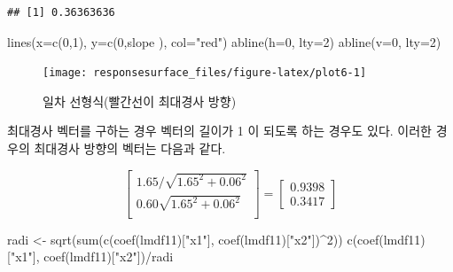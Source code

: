 \documentclass[
]{book}
\newenvironment{Shaded}{\begin{snugshade}}{\end{snugshade}}
\newcommand{\AttributeTok}[1]{\textcolor[rgb]{0.77,0.63,0.00}{#1}}
\newcommand{\DecValTok}[1]{\textcolor[rgb]{0.00,0.00,0.81}{#1}}
\newcommand{\FunctionTok}[1]{\textcolor[rgb]{0.00,0.00,0.00}{#1}}
\newcommand{\NormalTok}[1]{#1}
\newcommand{\OtherTok}[1]{\textcolor[rgb]{0.56,0.35,0.01}{#1}}
\newcommand{\SpecialCharTok}[1]{\textcolor[rgb]{0.00,0.00,0.00}{#1}}
\newcommand{\StringTok}[1]{\textcolor[rgb]{0.31,0.60,0.02}{#1}}
\theoremstyle{definition}
\theoremstyle{definition}
\theoremstyle{definition}
\theoremstyle{definition}
\theoremstyle{remark}
\begin{document}
\begin{verbatim}
## [1] 0.36363636
\end{verbatim}

\begin{Shaded}
\begin{Highlighting}[]
\FunctionTok{lines}\NormalTok{(}\AttributeTok{x=}\FunctionTok{c}\NormalTok{(}\DecValTok{0}\NormalTok{,}\DecValTok{1}\NormalTok{), }\AttributeTok{y=}\FunctionTok{c}\NormalTok{(}\DecValTok{0}\NormalTok{,slope ), }\AttributeTok{col=}\StringTok{"red"}\NormalTok{)}
\FunctionTok{abline}\NormalTok{(}\AttributeTok{h=}\DecValTok{0}\NormalTok{, }\AttributeTok{lty=}\DecValTok{2}\NormalTok{)}
\FunctionTok{abline}\NormalTok{(}\AttributeTok{v=}\DecValTok{0}\NormalTok{, }\AttributeTok{lty=}\DecValTok{2}\NormalTok{)}
\end{Highlighting}
\end{Shaded}

\begin{figure}

{\centering \texttt{[image: responsesurface\_files/figure-latex/plot6-1]} 

}

\caption{일차 선형식(빨간선이 최대경사 방향)}\label{fig:plot6}
\end{figure}

최대경사 벡터를 구하는 경우 벡터의 길이가 1 이 되도록 하는 경우도 있다. 이러한 경우의 최대경사 방향의 벡터는 다음과 같다.

\begin{equation}
\begin{bmatrix} 
1.65/\sqrt{1.65^2 + 0.06^2}  \\
0.60 \sqrt{1.65^2 + 0.06^2}  \\
\end{bmatrix} 
=
\begin{bmatrix} 
0.9398 \\
0.3417
\end{bmatrix} 
\label{eq:steepacenddata2}
\end{equation}

\begin{Shaded}
\begin{Highlighting}[]
\NormalTok{radi }\OtherTok{\textless{}{-}} \FunctionTok{sqrt}\NormalTok{(}\FunctionTok{sum}\NormalTok{(}\FunctionTok{c}\NormalTok{(}\FunctionTok{coef}\NormalTok{(lmdf11)[}\StringTok{"x1"}\NormalTok{], }\FunctionTok{coef}\NormalTok{(lmdf11)[}\StringTok{"x2"}\NormalTok{])}\SpecialCharTok{\^{}}\DecValTok{2}\NormalTok{))}
\FunctionTok{c}\NormalTok{(}\FunctionTok{coef}\NormalTok{(lmdf11)[}\StringTok{"x1"}\NormalTok{], }\FunctionTok{coef}\NormalTok{(lmdf11)[}\StringTok{"x2"}\NormalTok{])}\SpecialCharTok{/}\NormalTok{radi}
\end{Highlighting}
\end{Shaded}
\end{document}
